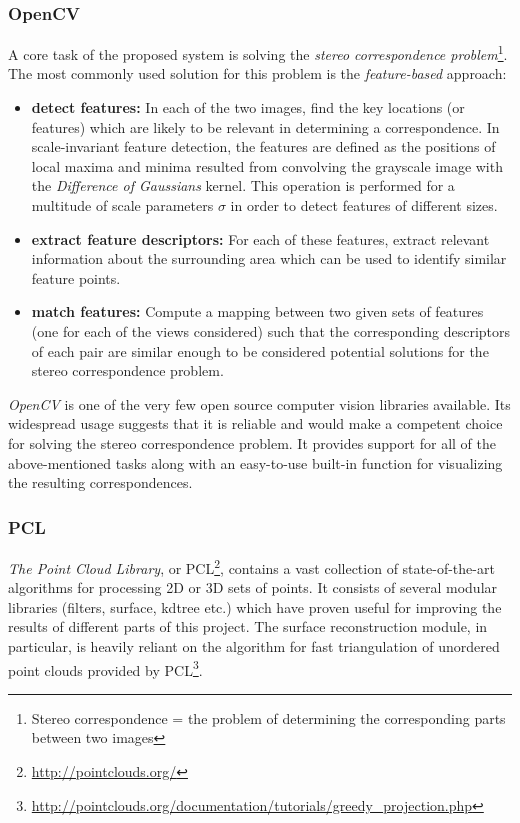 \documentclass[12pt,a4paper,twoside,openright]{report}
\begin{document}
\subsubsection{OpenCV}
A core task of the proposed system is solving the \emph{stereo correspondence problem}\footnote{Stereo correspondence = the problem of determining the corresponding parts between two images}. The most commonly used solution for this problem is the \emph{feature-based} approach:
\begin{itemize}
\item \textbf{detect features:} In each of the two images, find the key locations (or features) which are likely to be relevant in determining a correspondence. In scale-invariant feature detection, the features are defined as the positions of local maxima and minima resulted from convolving the grayscale image with the \emph{Difference of Gaussians} kernel. This operation is performed for a multitude of scale parameters $\sigma$ in order to detect features of different sizes.
\item \textbf{extract feature descriptors:} For each of these features, extract relevant information about the surrounding area which can be used to identify similar feature points.
\item \textbf{match features:} Compute a mapping between two given sets of features (one for each of the views considered) such that the corresponding descriptors of each pair are similar enough to be considered potential solutions for the stereo correspondence problem.
\end{itemize}

\emph{OpenCV} is one of the very few open source computer vision libraries available. Its widespread usage suggests that it is reliable and would make a competent choice for solving the stereo correspondence problem. It provides support for all of the above-mentioned tasks along with an easy-to-use built-in function for visualizing the resulting correspondences.

\subsubsection{PCL}
\emph{The Point Cloud Library}, or PCL\footnote{\url{http://pointclouds.org/}}, contains a vast collection of state-of-the-art algorithms for processing 2D or 3D sets of points. It consists of several modular libraries (filters, surface, kdtree etc.) which have proven useful for improving the results of different parts of this project. The surface reconstruction module, in particular, is heavily reliant on the algorithm for fast triangulation of unordered point clouds\cite{Marton09ICRA} provided by PCL\footnote{\url{http://pointclouds.org/documentation/tutorials/greedy_projection.php}}.
\end{document}
